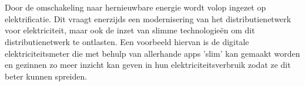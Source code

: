 
%
%
%
%
%

%



\chapter*{}

Door de omschakeling naar hernieuwbare energie wordt volop ingezet op elektrificatie. Dit vraagt enerzijds een modernisering van het distributienetwerk voor elektriciteit, maar ook de inzet van slimme technologieën om dit distributienetwerk te ontlasten. Een voorbeeld hiervan is de digitale elektriciteitsmeter die met behulp van allerhande apps 'slim' kan gemaakt worden en gezinnen zo meer inzicht kan geven in hun elektriciteitsverbruik zodat ze dit beter kunnen spreiden. \\

